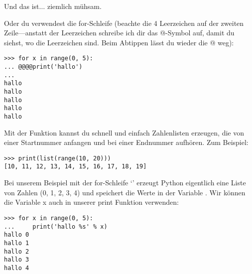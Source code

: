 Und das ist\texorpdfstring{$\ldots$}{...} ziemlich mühsam.

Oder du verwendest die for-Schleife (beachte die 4 Leerzeichen auf der zweiten Zeile---anstatt der Leerzeichen schreibe ich dir das @-Symbol auf, damit du siehst, wo die Leerzeichen sind. Beim Abtippen lässt du wieder die @ weg):

\begin{Verbatim}[frame=single]
>>> for x in range(0, 5):
... @@@@print('hallo')
...
hallo
hallo
hallo
hallo
hallo
\end{Verbatim}

Mit der  Funktion kannst du schnell und einfach Zahlenlisten erzeugen, die von einer Startnummer anfangen und bei einer Endnummer aufhören. Zum Beispiel:

\begin{Verbatim}[frame=single]
>>> print(list(range(10, 20)))
[10, 11, 12, 13, 14, 15, 16, 17, 18, 19]
\end{Verbatim}

Bei unserem Beispiel mit der for-Schleife `' erzeugt Python eigentlich eine Liste von Zahlen (0, 1, 2, 3, 4) und speichert die Werte in der Variable . Wir können die Variable x auch in unserer print Funktion verwenden:

\begin{Verbatim}[frame=single]
>>> for x in range(0, 5):
...     print('hallo %s' % x)
hallo 0
hallo 1
hallo 2
hallo 3
hallo 4
\end{Verbatim}

